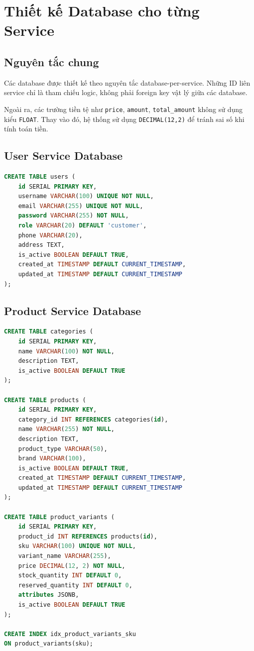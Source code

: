 \section{Thiết kế Database cho từng Service}

\subsection{Nguyên tắc chung}

Các database được thiết kế theo nguyên tắc database-per-service. Những ID liên service chỉ là tham chiếu logic, không phải foreign key vật lý giữa các database.

Ngoài ra, các trường tiền tệ như \texttt{price}, \texttt{amount}, \texttt{total\_amount} không sử dụng kiểu \texttt{FLOAT}. Thay vào đó, hệ thống sử dụng \texttt{DECIMAL(12,2)} để tránh sai số khi tính toán tiền.

\subsection{User Service Database}

\begin{lstlisting}[style=code,language=SQL]
CREATE TABLE users (
    id SERIAL PRIMARY KEY,
    username VARCHAR(100) UNIQUE NOT NULL,
    email VARCHAR(255) UNIQUE NOT NULL,
    password VARCHAR(255) NOT NULL,
    role VARCHAR(20) DEFAULT 'customer',
    phone VARCHAR(20),
    address TEXT,
    is_active BOOLEAN DEFAULT TRUE,
    created_at TIMESTAMP DEFAULT CURRENT_TIMESTAMP,
    updated_at TIMESTAMP DEFAULT CURRENT_TIMESTAMP
);
\end{lstlisting}

\subsection{Product Service Database}

\begin{lstlisting}[style=code,language=SQL]
CREATE TABLE categories (
    id SERIAL PRIMARY KEY,
    name VARCHAR(100) NOT NULL,
    description TEXT,
    is_active BOOLEAN DEFAULT TRUE
);

CREATE TABLE products (
    id SERIAL PRIMARY KEY,
    category_id INT REFERENCES categories(id),
    name VARCHAR(255) NOT NULL,
    description TEXT,
    product_type VARCHAR(50),
    brand VARCHAR(100),
    is_active BOOLEAN DEFAULT TRUE,
    created_at TIMESTAMP DEFAULT CURRENT_TIMESTAMP,
    updated_at TIMESTAMP DEFAULT CURRENT_TIMESTAMP
);

CREATE TABLE product_variants (
    id SERIAL PRIMARY KEY,
    product_id INT REFERENCES products(id),
    sku VARCHAR(100) UNIQUE NOT NULL,
    variant_name VARCHAR(255),
    price DECIMAL(12, 2) NOT NULL,
    stock_quantity INT DEFAULT 0,
    reserved_quantity INT DEFAULT 0,
    attributes JSONB,
    is_active BOOLEAN DEFAULT TRUE
);

CREATE INDEX idx_product_variants_sku
ON product_variants(sku);
\end{lstlisting}

